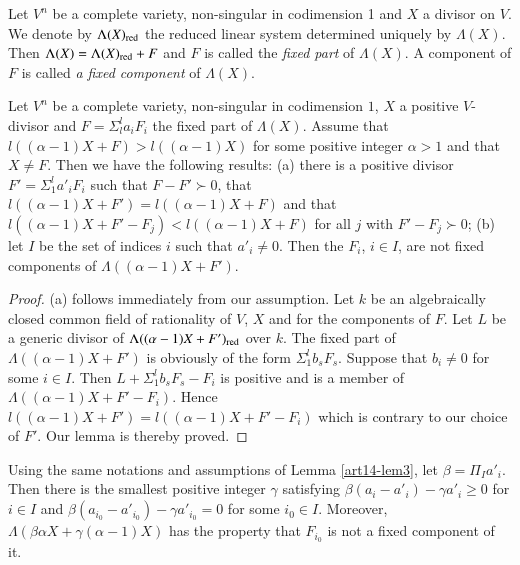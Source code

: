 Let $V^{n}$ be a complete variety, non-singular in codimension 1 and $X$ a divisor on $V$. We denote by $\Lambda(X)_{\operatorname{\mathrm{red}}}$ the reduced linear system determined uniquely by $\Lambda(X)$. Then $\Lambda(X)=\Lambda(X)_{\operatorname{\mathrm{red}}}+F$ and $F$ is called the {\em fixed part} of $\Lambda(X)$. A component of $F$ is called {\em a fixed component} of $\Lambda(X)$.

\begin{lemma}\label{art14-lem3}
Let $V^{n}$ be a complete variety, non-singular in codimension $1$, $X$ a positive $V$-divisor and $F=\Sigma^{l}_{l}a_{i}F_{i}$ the fixed part of $\Lambda(X)$. Assume that $l((\alpha-1)X+F)>l((\alpha-1)X)$ for some positive integer $\alpha>1$ and that $X\neq F$. Then we have the following results: {\rm(a)} there is a positive divisor $F'=\Sigma^{l}_{1}a'_{i}F_{i}$ such that $F-F'\succ 0$, that $l((\alpha-1)X+F')=l((\alpha-1)X+F)$ and that $l((\alpha-1)X+F'-F_{j})<l((\alpha-1)X+F)$ for all $j$ with $F'-F_{j}\succ 0$; {\rm(b)} let $I$ be the set of indices $i$ such that $a'_{i}\neq 0$. Then the $F_{i}$, $i\in I$, are not fixed components of $\Lambda((\alpha-1)X+F')$.
\end{lemma}

\begin{proof}
(a) follows immediately from our assumption. Let $k$ be an algebraically closed common field of rationality of $V$, $X$ and for the components of $F$. Let $L$ be a generic divisor of $\Lambda((\alpha-1)X+F')_{\operatorname{\mathrm{red}}}$ over $k$. The fixed part of $\Lambda((\alpha-1)X+F')$ is obviously of the form $\Sigma^{l}_{1}b_{s}F_{s}$. Suppose that $b_{i}\neq 0$ for some $i\in I$. Then $L+\Sigma^{l}_{1}b_{s}F_{s}-F_{i}$ is positive and is a member of $\Lambda((\alpha-1)X+F'-F_{i})$. Hence $l((\alpha-1)X+F')=l((\alpha-1)X+F'-F_{i})$ which is contrary to our choice of $F'$. Our lemma is thereby proved.
\end{proof}

\begin{lemma}\label{art14-lem4}
Using the same notations and assumptions of Lemma \ref{art14-lem3}, let $\beta=\Pi_{I}a'_{i}$. Then there is the smallest positive integer $\gamma$ satisfying $\beta(a_{i}-a'_{i})-\gamma a'_{i}\geq 0$ for $i\in I$ and $\beta(a_{i_{0}}-a'_{i_{0}})-\gamma a'_{i_{0}}=0$ for some $i_{0}\in I$. Moreover, $\Lambda(\beta\alpha X+\gamma(\alpha-1)X)$ has the property that $F_{i_{0}}$ is not a fixed component of it.
\end{lemma}

